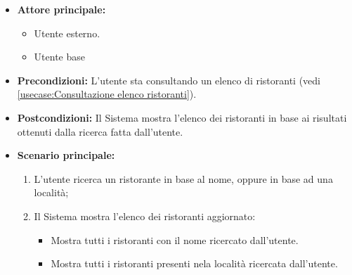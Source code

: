 \label{usecase:Ricerca ristorante}
\begin{itemize}
	\item \textbf{Attore principale:}
    \begin{itemize}
        \item Utente esterno.
        \item Utente base
    \end{itemize}
	
	\item \textbf{Precondizioni:} L'utente sta consultando un elenco di ristoranti (vedi \autoref{usecase:Consultazione elenco ristoranti}).

	\item \textbf{Postcondizioni:} Il Sistema mostra l'elenco dei ristoranti in base ai risultati ottenuti dalla ricerca fatta dall'utente.
 
	      
	\item \textbf{Scenario principale:}
	      \begin{enumerate}
		      \item L'utente ricerca un ristorante in base al nome, oppure in base ad una località;

		      \item Il Sistema mostra l'elenco dei ristoranti aggiornato:
		      \begin{itemize}
                \item Mostra tutti i ristoranti con il nome ricercato dall'utente.
                \item Mostra tutti i ristoranti presenti nela località ricercata dall'utente.
              \end{itemize}
	      \end{enumerate}

\end{itemize}


